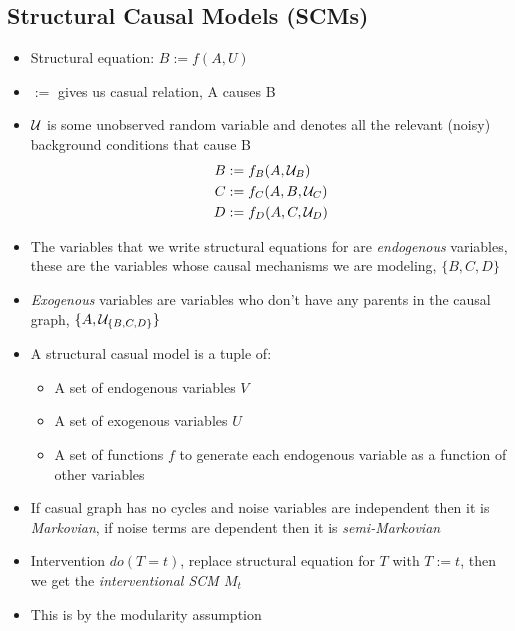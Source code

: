 \documentclass[../main.tex]{subfiles}
\begin{document}
  \subsection{Structural Causal Models (SCMs)}
    \begin{itemize}
      \item Structural equation: $B := f(A, U)$
      \item $:=$ gives us casual relation, A causes B
      \item $\mathcal{U}$ is some unobserved random variable and denotes all the relevant (noisy) background conditions that cause B
      \begin{align*}
        B &:= f_{B}(A, \mathcal{U}_{B}) \\
        C &:= f_{C}(A, B, \mathcal{U}_{C}) \\
        D &:= f_{D}(A, C, \mathcal{U}_{D}) \\
      \end{align*}
      \item The variables that we write structural equations for are \textit{endogenous} variables, these are the variables whose causal mechanisms we are modeling, $\{B, C, D\}$
      \item \textit{Exogenous} variables are variables who don't have any parents in the causal graph, $\{A, \mathcal{U}_{\{B, C, D\}}\}$
      \item A structural casual model is a tuple of:
      \begin{itemize}
        \item A set of endogenous variables $V$
        \item A set of exogenous variables $U$
        \item A set of functions $f$ to generate each endogenous variable as a function of other variables
      \end{itemize}
      \item If casual graph has no cycles and noise variables are independent then it is \textit{Markovian}, if noise terms are dependent then it is \textit{semi-Markovian}
      \item Intervention $do(T=t)$, replace structural equation for $T$ with $T:=t$, then we get the \textit{interventional SCM $M_{t}$}
      \item This is by the modularity assumption

    \end{itemize}
\end{document}
